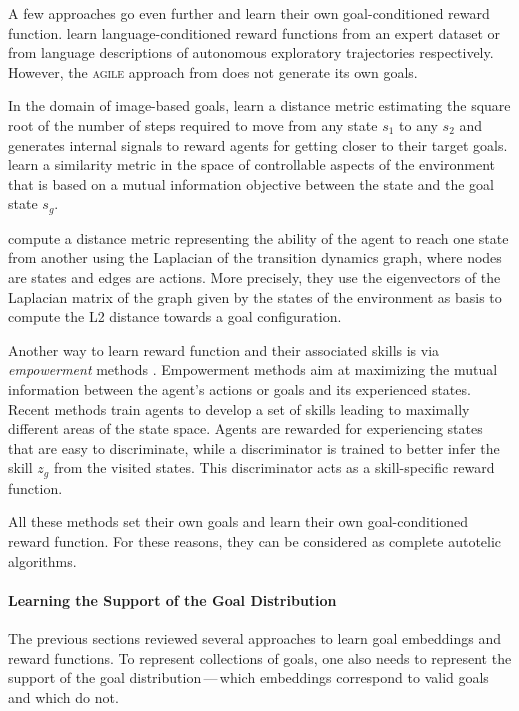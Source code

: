 A few approaches go even further and learn their own goal-conditioned reward function. \cite{bahdanau2018learning,imagine} learn language-conditioned reward functions from an expert dataset or from language descriptions of autonomous exploratory trajectories respectively. However, the \textsc{agile} approach from \cite{bahdanau2018learning} does not generate its own goals.

In the domain of image-based goals, \cite{venkattaramanujam2019self,hartikainen2019dynamical} learn a distance metric estimating the square root of the number of steps required to move from any state $s_1$ to any $s_2$ and generates internal signals to reward agents for getting closer to their target goals. \cite{warde2018unsupervised} learn a similarity metric in the space of controllable aspects of the environment that is based on a mutual information objective between the state and the goal state $s_g$.

\cite{wu2018laplacian} compute a distance metric representing the ability of the agent to reach one state from another using the Laplacian of the transition dynamics graph, where nodes are states and edges are actions. More precisely, they use the eigenvectors of the Laplacian matrix of the graph given by the states of the environment as basis to compute the L2 distance towards a goal configuration.

Another way to learn reward function and their associated skills is via \textit{empowerment} methods \cite{mohamed_variational_2015,gregor2016variational,achiam_variational_2018,eysenbach2018diversity,dai_empowerment-based_2020,sharma_dynamics-aware_2020,choi_variational_2021}. Empowerment methods aim at maximizing the mutual information between the agent's actions or goals and its experienced states. Recent methods train agents to develop a set of skills leading to maximally different areas of the state space. Agents are rewarded for experiencing states that are easy to discriminate, while a discriminator is trained to better infer the skill $z_g$ from the visited states. This discriminator acts as a skill-specific reward function. 

All these methods set their own goals and learn their own goal-conditioned reward function. For these reasons, they can be considered as complete autotelic \rl algorithms.

\paragraph{Learning the Support of the Goal Distribution}
The previous sections reviewed several approaches to learn goal embeddings and reward functions. To represent collections of goals, one also needs to represent the support of the goal distribution\,---\,which embeddings correspond to valid goals and which do not.

